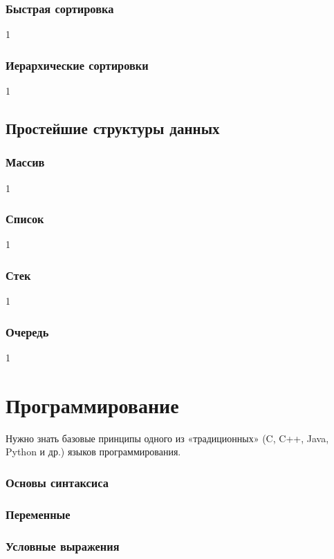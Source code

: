 \documentclass[12pt]{matmex-diploma}
\begin{document}
        \subsubsection*{Быстрая сортировка}
            1
        \subsubsection*{Иерархические сортировки}
            1
    \subsection{Простейшие структуры данных}
    
        \subsubsection*{Массив}
            1
        \subsubsection*{Список}
            1
        \subsubsection*{Стек}
            1
        \subsubsection*{Очередь}
            1
            
\section{Программирование}     

    Нужно знать базовые принципы одного из «традиционных» (C, C++, Java, Python и др.) языков программирования.
    
    \subsubsection*{Основы синтаксиса}
    
    \subsubsection*{Переменные}
    
    \subsubsection*{Условные выражения}
    
\end{document}
